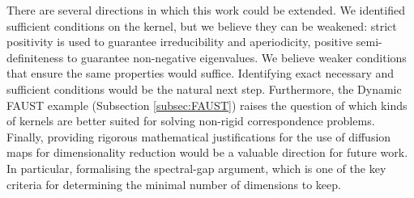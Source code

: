 There are several directions in which this work could be extended. We identified sufficient conditions on the kernel, but we believe they can be weakened: strict positivity is used to guarantee irreducibility and aperiodicity, positive semi-definiteness to guarantee non-negative eigenvalues. We believe weaker conditions that ensure the same properties would suffice. Identifying exact necessary and sufficient conditions would be the natural next step. Furthermore, the Dynamic FAUST example (Subsection \ref{subsec:FAUST}) raises the question of which kinds of kernels are better suited for solving non-rigid correspondence problems. Finally, providing rigorous mathematical justifications for the use of diffusion maps for dimensionality reduction would be a valuable direction for future work. In particular, formalising the spectral-gap argument, which is one of the key criteria for determining the minimal number of dimensions to keep.